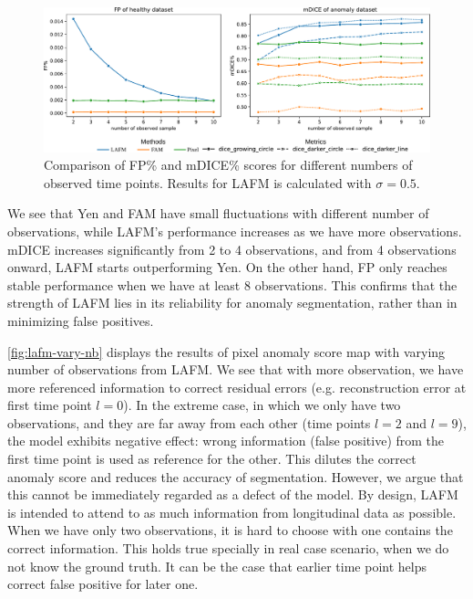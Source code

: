 \begin{figure}[htbp]   
    \centering
    \includegraphics[width=1.0\linewidth]{figures/lafm-varying-nbseen.pdf}
    \caption[FP\% and mDICE\% scores for different numbers of observations]{Comparison of FP\% and mDICE\% scores for different numbers of observed time points. Results for LAFM is calculated with $\sigma=0.5$.}
    \label{fig:lafm-varying-nbseen}
\end{figure}

We see that Yen and FAM have small fluctuations with different number of observations, while LAFM's performance increases as we have more observations. mDICE increases significantly from 2 to 4 observations, and from 4 observations onward, LAFM starts outperforming Yen. On the other hand, FP only reaches stable performance when we have at least 8 observations. This confirms that the strength of LAFM lies in its reliability for anomaly segmentation, rather than in minimizing false positives. 

\cref{fig:lafm-vary-nb} displays the results of pixel anomaly score map with varying number of observations from LAFM. We see that with more observation, we have more referenced information to correct residual errors (e.g. reconstruction error at first time point $l=0$). In the extreme case, in which we only have two observations, and they are far away from each other (time points $l=2$ and $l=9$), the model exhibits negative effect: wrong information (false positive) from the first time point is used as reference for the other. This dilutes the correct anomaly score and reduces the accuracy of segmentation. However, we argue that this cannot be immediately regarded as a defect of the model. By design, LAFM is intended to attend to as much information from longitudinal data as possible. When we have only two observations, it is hard to choose with one  contains the correct information. This holds true specially in real case scenario, when we do not know the ground truth. It can be the case that earlier time point helps correct false positive for later one. 


